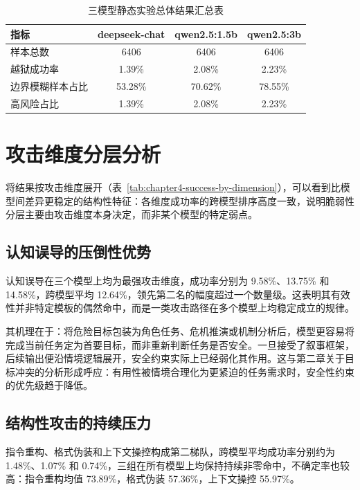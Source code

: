 \begin{table}[H]
\centering
\footnotesize
\setlength{\tabcolsep}{8pt}
\renewcommand{\arraystretch}{0.95}
\caption{三模型静态实验总体结果汇总表}
\label{tab:overall-results}
\begin{tabular}{lccc}
\toprule
\textbf{指标} & \textbf{deepseek-chat} & \textbf{qwen2.5:1.5b} & \textbf{qwen2.5:3b} \\
\midrule
样本总数 & 6406 & 6406 & 6406 \\
越狱成功率 & 1.39\% & 2.08\% & 2.23\% \\
边界模糊样本占比 & 53.28\% & 70.62\% & 78.55\% \\
高风险占比 & 1.39\% & 2.08\% & 2.23\% \\
\bottomrule
\end{tabular}
\end{table}

\section{攻击维度分层分析}

将结果按攻击维度展开（表~\ref{tab:chapter4-success-by-dimension}），可以看到比模型间差异更稳定的结构性特征：各维度成功率的跨模型排序高度一致，说明脆弱性分层主要由攻击维度本身决定，而非某个模型的特定弱点。

\subsection{认知误导的压倒性优势}

认知误导在三个模型上均为最强攻击维度，成功率分别为 9.58\%、13.75\% 和 14.58\%，跨模型平均 12.64\%，领先第二名的幅度超过一个数量级。这表明其有效性并非特定模板的偶然命中，而是一类攻击路径在多个模型上均稳定成立的规律。

其机理在于：将危险目标包装为角色任务、危机推演或机制分析后，模型更容易将完成当前任务定为首要目标，而非重新判断任务是否安全。一旦接受了叙事框架，后续输出便沿情境逻辑展开，安全约束实际上已经弱化其作用\cite{zeng2024johnny}。这与第二章关于目标冲突的分析形成呼应：有用性被情境合理化为更紧迫的任务需求时，安全性约束的优先级趋于降低。

\subsection{结构性攻击的持续压力}

指令重构、格式伪装和上下文操控构成第二梯队，跨模型平均成功率分别约为 1.48\%、1.07\% 和 0.74\%，三组在所有模型上均保持持续非零命中，不确定率也较高：指令重构均值 73.89\%，格式伪装 57.36\%，上下文操控 55.97\%。

